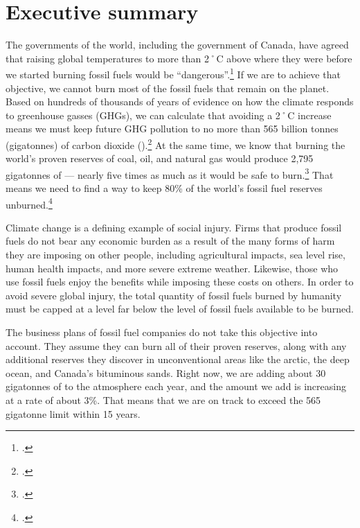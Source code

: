 
		\section{Executive summary}
		\label{sec:ExecutiveSummary}


The governments of the world, including the government of Canada, have agreed that raising global temperatures to more than 2˚C above where they were before we started burning fossil fuels would be ``dangerous''.\footcite[][]{CopenhagenAccord}
If we are to achieve that objective, we cannot burn most of the fossil fuels that remain on the planet.
Based on hundreds of thousands of years of evidence on how the climate responds to greenhouse gasses (GHGs), we can calculate that avoiding a 2˚C increase means we must keep future GHG pollution to no more than 565 billion tonnes (gigatonnes) of carbon dioxide ().\footcite[For an excellent summary that is accessible to non-experts see: ][]{TerrifyingNewMath}
At the same time, we know that burning the world's proven reserves of coal, oil, and natural gas would produce 2,795 gigatonnes of  --- nearly five times as much as it would be safe to burn.\footcite[][]{CTI2012}
That means we need to find a way to keep 80\% of the world's fossil fuel reserves unburned.\footcite[Another accessible summary of the issue can be found in: ][]{HotBackyard}



Climate change is a defining example of social injury.
Firms that produce fossil fuels do not bear any economic burden as a result of the many forms of harm they are imposing on other people, including agricultural impacts, sea level rise, human health impacts, and more severe extreme weather.
Likewise, those who use fossil fuels enjoy the benefits while imposing these costs on others.
In order to avoid severe global injury, the total quantity of fossil fuels burned by humanity must be capped at a level far below the level of fossil fuels available to be burned.



The business plans of fossil fuel companies do not take this objective into account.
They assume they can burn all of their proven reserves, along with any additional reserves they discover in unconventional areas like the arctic, the deep ocean, and Canada's bituminous sands.
Right now, we are adding about 30 gigatonnes of  to the atmosphere each year, and the amount we add is increasing at a rate of about 3\%.
That means that we are on track to exceed the 565 gigatonne limit within 15 years.



